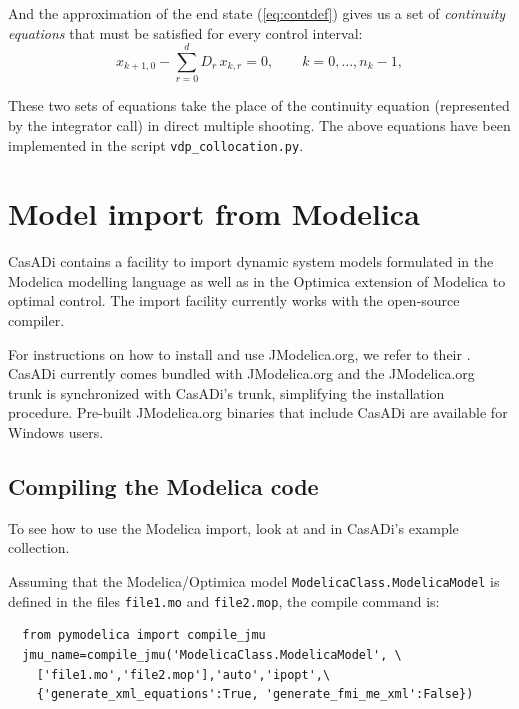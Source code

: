 \documentclass[a4paper,12pt]{book}
\begin{document}
{And the approximation of the end state (\ref{eq:contdef}) gives us a set of \emph{continuity equations} that must be satisfied for every control interval:
\begin{equation}
x_{k+1,0} - \sum_{r=0}^{d}{D_r \, x_{k,r}} = 0, \qquad k=0,\ldots,n_k-1, 
\end{equation}

These two sets of equations take the place of the continuity equation (represented by the integrator call) in direct multiple shooting. The above equations have been implemented in the script \texttt{vdp\_collocation.py}.

\chapter{Model import from Modelica}\label{sec:modelica}
CasADi contains a facility to import dynamic system models formulated in the Modelica modelling language as well as in the Optimica extension of Modelica to optimal control. The import facility currently works with the open-source  compiler.

For instructions on how to install and use JModelica.org, we refer to their . CasADi currently comes bundled with JModelica.org and the JModelica.org trunk is synchronized with CasADi's trunk, simplifying the installation procedure. Pre-built JModelica.org binaries that include CasADi are available for Windows users.

\section{Compiling the Modelica code} \label{sec:modelica_compilation}
To see how to use the Modelica import, look at  and  in CasADi's example collection. 

Assuming that the Modelica/Optimica model \texttt{ModelicaClass.ModelicaModel} is defined in the files \texttt{file1.mo} and \texttt{file2.mop}, the compile command is:
\begin{verbatim}
  from pymodelica import compile_jmu
  jmu_name=compile_jmu('ModelicaClass.ModelicaModel', \
    ['file1.mo','file2.mop'],'auto','ipopt',\
    {'generate_xml_equations':True, 'generate_fmi_me_xml':False})
\end{verbatim}

}
\end{document}
